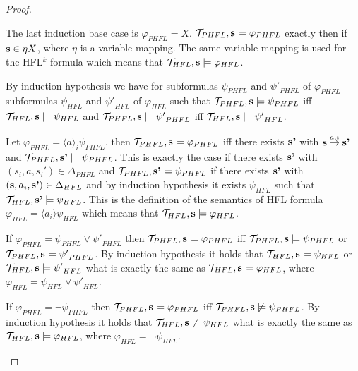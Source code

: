 \begin{proof}
\begin{compactitem}
        \item The last induction base case is $\varphi_{PHFL} = X$. $\mathcal{T}_{PHFL}, \emph{s} \models
        \varphi_{PHFL}$ exactly then if $\emph{s} \in \eta{X}$, where $\eta$ is a variable mapping. The same variable
        mapping is used for the HFL$^k$ formula which means that $\mathcal{T}_{HFL}, \emph{s} \models \varphi_{HFL}$.
    \end{compactitem}
    By induction hypothesis we have for subformulas $\psi_{PHFL}$ and ${\psi'}_{PHFL}$ of $\varphi_{PHFL}$
    subformulas $\psi_{HFL}$ and ${\psi'}_{HFL}$ of $\varphi_{HFL}$ such that $\mathcal{T}_{PHFL}, \emph{s} \models
    \psi_{PHFL}$ iff $\mathcal{T}_{HFL}, \emph{s} \models \psi_{HFL}$ and $\mathcal{T}_{PHFL}, \emph{s} \models
    {\psi'}_{PHFL}$ iff $\mathcal{T}_{HFL}, \emph{s} \models {\psi'}_{HFL}$.
    \begin{compactitem}
        \item Let $\varphi_{PHFL} = \langle a \rangle_i \psi_{PHFL}$, then $\mathcal{T}_{PHFL}, \emph{s} \models
        \varphi_{PHFL}$ iff there exists $\emph{s'}$ with $\emph{s} \overset{a, i}{\rightarrow} \emph{s'}$ and
        $\mathcal{T}_{PHFL}, \emph{s'} \models \psi_{PHFL}$. This is exactly the case if there exists $\emph{s'}$
        with $(s_i, a, {s_i}') \in \Delta_{PHFL}$ and $\mathcal{T}_{PHFL}, \emph{s'} \models \psi_{PHFL}$ if there
        exists $\emph{s'}$ with $(\emph{s}, a_i, \emph{s'}) \in \Delta_{HFL}$ and by induction hypothesis it exists
        $\psi_{HFL}$ such that $\mathcal{T}_{HFL}, \emph{s'} \models \psi_{HFL}$. This is the definition of the
        semantics of HFL formula $\varphi_{HFL} = \langle a_i \rangle \psi_{HFL}$ which means that
        $\mathcal{T}_{HFL}, \emph{s} \models \varphi_{HFL}$.

        \item If $\varphi_{PHFL} = \psi_{PHFL} \vee {\psi'}_{PHFL}$ then $\mathcal{T}_{PHFL}, \emph{s} \models
        \varphi_{PHFL}$ iff $\mathcal{T}_{PHFL}, \emph{s} \models \psi_{PHFL}$ or $\mathcal{T}_{PHFL}, \emph{s}
        \models {\psi'}_{PHFL}$. By induction hypothesis it holds that $\mathcal{T}_{HFL}, \emph{s} \models
        \psi_{HFL}$ or $\mathcal{T}_{HFL}, \emph{s} \models {\psi'}_{HFL}$ what is exactly the same as
        $\mathcal{T}_{HFL}, \emph{s} \models \varphi_{HFL}$, where $\varphi_{HFL} = \psi_{HFL} \vee {\psi'}_{HFL}$.

        \item If $\varphi_{PHFL} = \neg \psi_{PHFL}$ then $\mathcal{T}_{PHFL}, \emph{s} \models \varphi_{PHFL}$ iff
        $\mathcal{T}_{PHFL}, \emph{s} \not\models \psi_{PHFL}$. By induction hypothesis it holds that
        $\mathcal{T}_{HFL}, \emph{s} \not\models \psi_{HFL}$ what is exactly the same as $\mathcal{T}_{HFL}, \emph{s}
        \models \varphi_{HFL}$, where $\varphi_{HFL} = \neg\psi_{HFL}$.


\end{compactitem}
\end{proof}
